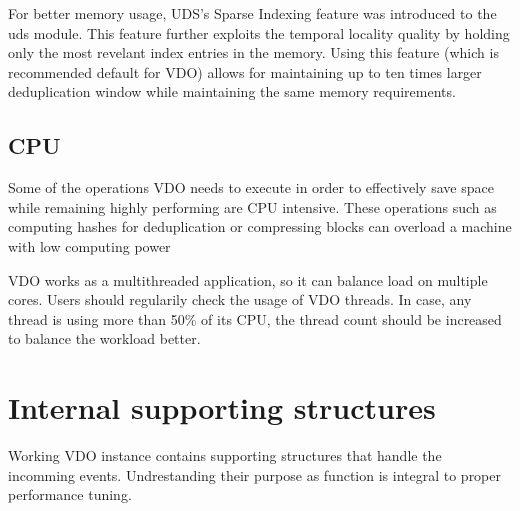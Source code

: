 \documentclass[
  color, %
  table, %
  lof,   %
  lot,   %
]{fithesis3}
\begin{document}
For better memory usage, UDS's Sparse Indexing feature was introduced to the uds module. This feature further exploits the temporal locality quality by holding only the most revelant index entries in the memory. Using this feature (which is recommended default for VDO) allows for maintaining up to ten times larger deduplication window while maintaining the same memory requirements.





\subsection{CPU}
Some of the operations VDO needs to execute in order to effectively save space while remaining highly performing are CPU intensive. These operations such as computing hashes for deduplication or compressing blocks can overload a machine with low computing power

VDO works as a multithreaded application, so it can balance load on multiple cores. Users should regularily check the usage of VDO threads. In case, any thread is using more than 50\% of its CPU, the thread count should be increased to balance the workload better.

\section{Internal supporting structures}
Working VDO instance contains supporting structures that handle the incomming events. Undrestanding their purpose as function is integral to proper performance tuning.
\end{document}
